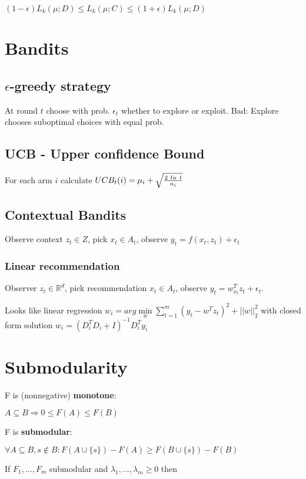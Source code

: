 \documentclass[a4paper,11pt,twocolumn]{article}
\begin{document}
$(1-\epsilon)L_k(\mu;D) \leq 
L_k(\mu;C) \leq
(1+\epsilon)L_k(\mu;D)$

\section{Bandits}

\subsection{$\epsilon$-greedy strategy}
At round $t$ choose with prob. $\epsilon_t$ whether to explore or exploit. Bad: Explore chooses suboptimal choices with equal prob.

\subsection{UCB - Upper confidence Bound}
For each arm $i$ calculate $UCB_t(i) = 
\mu_i + 
\sqrt{{2~ln~t} \over n_i}$	

\subsection{Contextual Bandits}
Observe context $z_t \in Z$, pick $x_t \in A_t$, observe $y_t = f(x_t, z_t) + \epsilon_t$

\subsubsection{Linear recommendation}
Observer $z_t \in \mathbb{R}^d$, pick recommendation $x_t \in A_t$, observe $y_t = w_{x_t}^T z_t + \epsilon_t$.

Looks like linear regression 
$w_i = arg \min \limits_w \sum \limits_{t=1}^m (y_t - w^T z_t)^2 + ||w||_2^2$ 
with closed form solution $w_i = (D_i^T D_i + I)^{-1} D_i^T y_i$

\section{Submodularity}

F is (nonnegative) \textbf{monotone}: 

$A \subseteq B \Rightarrow 0 \leq F(A)  \leq F(B)$


F is \textbf{submodular}: 

$\forall A \subseteq B, s \notin B:  F(A \cup \lbrace s  \rbrace) - F(A) \geq F(B \cup \lbrace s \rbrace ) - F(B)$



If $F_1,...,F_m$ submodular and $\lambda_1,...,\lambda_m \geq 0 $ then
\end{document}
